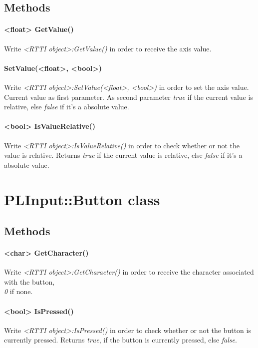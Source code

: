 \subsection{Methods}

\paragraph{<float> GetValue()}
Write \emph{<RTTI object>:GetValue()} in order to receive the axis value.

\paragraph{SetValue(<float>, <bool>)}
Write \emph{<RTTI object>:SetValue(<float>, <bool>)} in order to set the axis value. Current value as first parameter. As second parameter \emph{true} if the current value is relative, else \emph{false} if it's a absolute value.

\paragraph{<bool> IsValueRelative()}
Write \emph{<RTTI object>:IsValueRelative()} in order to check whether or not the value is relative. Returns \emph{true} if the current value is relative, else \emph{false} if it's a absolute value.




\section{PLInput::Button class}


\subsection{Methods}

\paragraph{<char> GetCharacter()}
Write \emph{<RTTI object>:GetCharacter()} in order to receive the character associated with the button, \emph{\\0} if none.

\paragraph{<bool> IsPressed()}
Write \emph{<RTTI object>:IsPressed()} in order to check whether or not the button is currently pressed. Returns \emph{true}, if the button is currently pressed, else \emph{false}.

